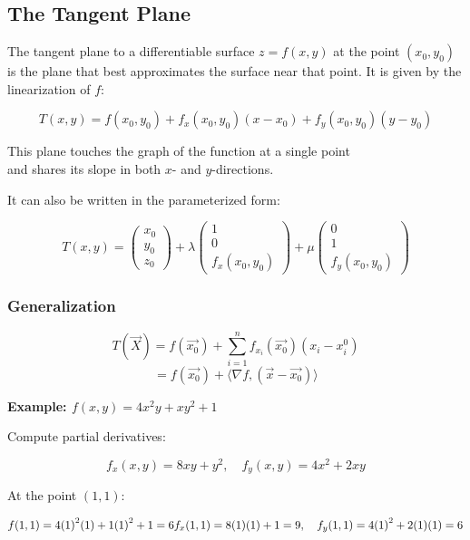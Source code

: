 \subsection{The Tangent Plane}

The tangent plane to a differentiable surface \( z = f(x, y) \) at the point \( (x_0, y_0) \) is the 
plane that best approximates the surface near that point. It is given by the linearization of \( f \):

\[
    T(x, y) = f(x_0, y_0) + f_x(x_0, y_0)(x - x_0) + f_y(x_0, y_0)(y - y_0)
\]

This plane touches the graph of the function at a single point\\
and shares its slope in both \( x \)- and \( y \)-directions.

It can also be written in the parameterized form:

\[
    T(x,y) = \begin{pmatrix} x_0\\ y_0\\ z_0\end{pmatrix} + \lambda 
    \begin{pmatrix} 1\\ 0 \\ f_x(x_0,y_0)\end{pmatrix} + \mu \begin{pmatrix}
    0 \\ 1 \\ f_y(x_0, y_0)
    \end{pmatrix}
\]

\subsubsection{Generalization}

\[
    T(\vec{X}) = f(\vec{x_0}) + \sum_{i = 1}^{n} f_{x_i}(\vec{x_0})(x_i - x_{i}^0)
\]
\[
    = f(\vec{x_0}) + \langle \nabla f, (\vec{x} - \vec{x_0})\rangle
\]

\textbf{Example: \( f(x, y) = 4x^2y + xy^2 + 1 \)}
\vspace{\baselineskip}

Compute partial derivatives:

\[
    f_x(x, y) = 8xy + y^2, \quad f_y(x, y) = 4x^2 + 2xy
\]

At the point \( (1, 1) \):

\[
    f(1, 1) = 4{(1)}^2(1) + 1{(1)}^2 + 1 = 6 \\
    f_x(1, 1) = 8(1)(1) + 1 = 9, \quad f_y(1, 1) = 4{(1)}^2 + 2(1)(1) = 6
\]

